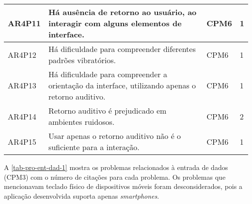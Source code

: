 \begin{table}[htb]
\begin{center}
\begin{tabular}{p{1.2cm}|p{10.0cm}|p{1.4cm}|p{1.4cm}}
      \hline
      AR4P11          & Há ausência de retorno ao usuário, ao interagir com alguns elementos de interface.               & CPM6               & 1                 \\
      \hline
      AR4P12          & Há dificuldade para compreender diferentes padrões vibratórios.                                  & CPM6               & 1                 \\
      \hline
      AR4P13          & Há dificuldade para compreender a orientação da interface, utilizando apenas o retorno auditivo. & CPM6               & 1                 \\
      \hline
      AR4P14          & Retorno auditivo é prejudicado em ambientes ruidosos.                                            & CPM6               & 2                 \\
      \hline
      AR4P15          & Usar apenas o retorno auditivo não é o suficiente para a interação.                              & CPM6               & 1                 \\
    \end{tabular}
  \end{center}
\end{table}

\newpage

A \autoref{tab-pro-ent-dad-1} mostra os problemas relacionados à entrada de dados (CPM3) com o número de citações para cada problema.
Os problemas que mencionavam teclado físico de dispositivos móveis foram desconsiderados, pois a aplicação desenvolvida suporta apenas
\emph{smartphones}.


